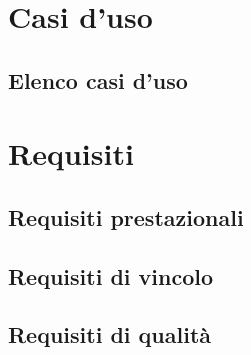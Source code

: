 \documentclass[a4paper, oneside, dvipsnames, table]{article}
\begin{document}
\copertina{}
\newpage



\fancyAR{}

\clearpage
\tableofcontents
\clearpage

\section{Casi d'uso}

\clearpage
\subsection{Elenco casi d'uso}
\setcounter{secnumdepth}{0}


\section{Requisiti}
\setcounter{secnumdepth}{0}

\clearpage
\subsection{Requisiti prestazionali}

\clearpage
\subsection{Requisiti di vincolo}

\clearpage
\subsection{Requisiti di qualità}

\end{document}

